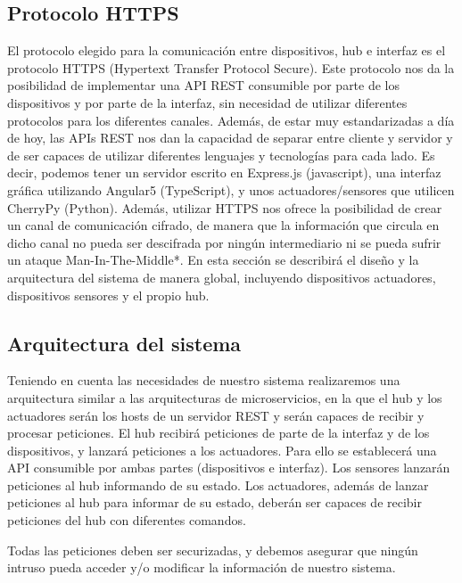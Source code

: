 \subsection{Protocolo HTTPS}
El protocolo elegido para la comunicación entre dispositivos, hub e interfaz es el protocolo HTTPS (Hypertext Transfer Protocol Secure).
\newline
Este protocolo nos da la posibilidad de implementar una API REST consumible por parte de los dispositivos y por parte de la interfaz,
sin necesidad de utilizar diferentes protocolos para los diferentes canales. 
\newline
Además, de estar muy estandarizadas a día de hoy, las APIs REST nos dan la capacidad de separar entre cliente y servidor y de ser capaces
de utilizar diferentes lenguajes y tecnologías para cada lado. Es decir, podemos tener un servidor escrito en Express.js (javascript), una interfaz 
gráfica utilizando Angular5 (TypeScript), y unos actuadores/sensores que utilicen CherryPy (Python).
\newline
Además, utilizar HTTPS nos ofrece la posibilidad de crear un canal de comunicación cifrado, de manera que la información que circula en dicho 
canal no pueda ser descifrada por ningún intermediario ni se pueda sufrir un ataque Man-In-The-Middle*.
En esta sección se describirá el diseño y la arquitectura del sistema de manera global, incluyendo dispositivos actuadores, 
dispositivos sensores y el propio hub.
\subsection{Arquitectura del sistema}
Teniendo en cuenta las necesidades de nuestro sistema realizaremos una arquitectura similar a las arquitecturas de microservicios,
en la que el hub y los actuadores serán los hosts de un servidor REST y serán capaces de recibir y procesar peticiones.
\newline
El hub recibirá peticiones de parte de la interfaz y de los dispositivos, y lanzará peticiones a los actuadores. Para ello se establecerá una API consumible por ambas partes (dispositivos e interfaz).
Los sensores lanzarán peticiones al hub informando de su estado.
Los actuadores, además de lanzar peticiones al hub para informar de su estado, deberán ser capaces de recibir peticiones del hub con
diferentes comandos.

Todas las peticiones deben ser securizadas, y debemos asegurar que ningún intruso pueda acceder y/o modificar la información de nuestro sistema.

